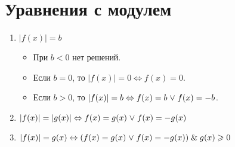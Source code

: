 \section{Уравнения с модулем}
\begin{enumerate}
	\item $|f(x)| = b$
	\begin{itemize}
		\item При $b < 0$ нет решений.
		\item Если $b = 0$, то $|f(x)| = 0 \Leftrightarrow f(x) = 0$.
		\item Если $b > 0$, то $|f(x)| = b \Leftrightarrow f(x) = b \mathrel{\lor} f(x) = -b$.
	\end{itemize}
	
	\item $|f(x)| = |g(x)| \Leftrightarrow f(x) = g(x) \mathrel{\lor} f(x) = -g(x)$
	
	\item $|f(x)| = g(x) \Leftrightarrow (f(x) = g(x) \mathrel{\lor} f(x) = -g(x)) \mathrel{\&} g(x) \geqslant 0$
\end{enumerate}